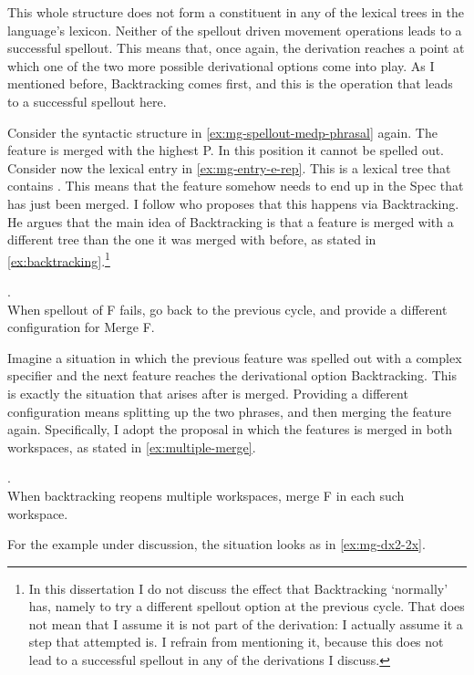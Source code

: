 This whole structure does not form a constituent in any of the lexical trees in the language's lexicon. Neither of the spellout driven movement operations leads to a successful spellout. This means that, once again, the derivation reaches a point at which one of the two more possible derivational options come into play. As I mentioned before, Backtracking comes first, and this is the operation that leads to a successful spellout here.

Consider the syntactic structure in \ref{ex:mg-spellout-medp-phrasal} again. The feature  is merged with the highest P. In this position it cannot be spelled out.
Consider now the lexical entry in \ref{ex:mg-entry-e-rep}. This is a lexical tree that contains . This means that the feature  somehow needs to end up in the Spec that has just been merged.
I follow \citet{caha2019} who proposes that this happens via Backtracking. He argues that the main idea of Backtracking is that a feature is merged with a different tree than the one it was merged with before, as stated in \ref{ex:backtracking}.\footnote{
In this dissertation I do not discuss the effect that Backtracking `normally' has, namely to try a different spellout option at the previous cycle. That does not mean that I assume it is not part of the derivation: I actually assume it a step that attempted is. I refrain from mentioning it, because this does not lead to a successful spellout in any of the derivations I discuss.
}

\ex.  \\\label{ex:backtracking}
When spellout of F fails, go back to the previous cycle, and provide a different configuration for Merge F.

Imagine a situation in which the previous feature was spelled out with a complex specifier and the next feature reaches the derivational option Backtracking. This is exactly the situation that arises after  is merged. Providing a different configuration means splitting up the two phrases, and then merging the feature again. Specifically, I adopt the proposal in which the features is merged in both workspaces, as stated in \ref{ex:multiple-merge}.

\ex.  \\\label{ex:multiple-merge}
When backtracking reopens multiple workspaces, merge F in each such workspace.

For the example under discussion, the situation looks as in \ref{ex:mg-dx2-2x}.

